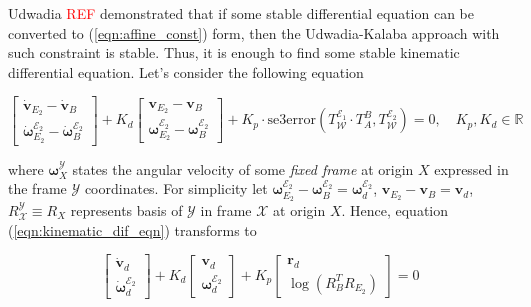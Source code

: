 Udwadia \textcolor{red}{REF} demonstrated that if some stable differential 
equation can be converted to (\ref{eqn:affine_const}) form, then the Udwadia-Kalaba 
approach with such constraint is stable. Thus, it is enough to find some stable 
kinematic differential equation. Let's consider the following equation 

\begin{equation}
    \begin{bmatrix}
        \dot{\mathbf{v}}_{E_2} - \dot{\mathbf{v}}_B \\
        \dot{\boldsymbol{\omega}}_{E_2}^{\mathcal{E}_2} - 
        \dot{\boldsymbol{\omega}}_B^{\mathcal{E}_2}
    \end{bmatrix} 
    + K_d 
    \begin{bmatrix}
        \mathbf{v}_{E_2} - \mathbf{v}_B \\
        \boldsymbol{\omega}_{E_2}^{\mathcal{E}_2} - 
        \boldsymbol{\omega}_B^{\mathcal{E}_2}
    \end{bmatrix}
    + K_p \cdot
    \text{se3error}(
        T_{\mathcal{W}}^{\mathcal{E}_1} \cdot
        T_{A}^{B},
        T_{\mathcal{W}}^{\mathcal{E}_2}
    ) = 0, \quad 
    K_p, K_d \in \mathbb{R}
    \label{eqn:kinematic_dif_eqn}
\end{equation}

where $\boldsymbol{\omega}_X^{\mathcal{Y}}$ states the angular velocity of some 
\emph{fixed frame} at origin $X$ expressed in the frame $\mathcal{Y}$ coordinates.  
For simplicity let $\boldsymbol{\omega}_{E_2}^{\mathcal{E}_2} - 
\boldsymbol{\omega}_B^{\mathcal{E}_2} = \boldsymbol{\omega}_d^{\mathcal{E}_2}$, 
$\mathbf{v}_{E_2} - \mathbf{v}_B = \mathbf{v}_d$, $R_{\mathcal{X}}^{\mathcal{Y}} 
\equiv R_X$ represents basis of $\mathcal{Y}$ in frame $\mathcal{X}$ at origin $X$.
Hence, equation (\ref{eqn:kinematic_dif_eqn}) transforms to 

\begin{equation}
    \begin{bmatrix}
        \dot{\mathbf{v}}_d \\
        \dot{\boldsymbol{\omega}}_d^{\mathcal{E}_2}
    \end{bmatrix}
    + K_d
    \begin{bmatrix}
        \mathbf{v}_d \\
        \boldsymbol{\omega}_d^{\mathcal{E}_2}
    \end{bmatrix}
    + K_p
    \begin{bmatrix}
        \mathbf{r}_d \\
        \log (R_B^T R_{E_2})
    \end{bmatrix}
    = 0
    \label{eqn:kinematic_dif_eqn_simple}
\end{equation}


